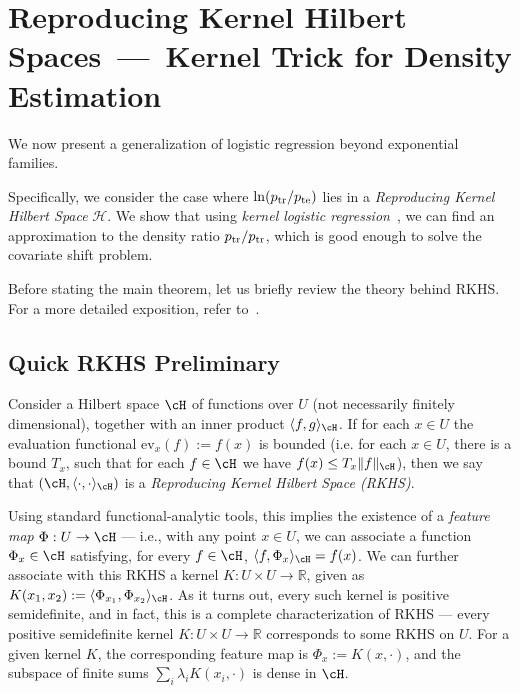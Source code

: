 \section{Reproducing Kernel Hilbert Spaces~---~Kernel Trick for Density Estimation}\label{sec:RKHS}
We now present a generalization of logistic regression beyond exponential families.

Specifically, we consider the case where $\ln (p_{\mathrm{tr}}/p_{\mathrm{te}})$ lies in a \emph{Reproducing Kernel Hilbert Space} $\mathcal{H}$. We show that using \emph{kernel logistic regression}~\cite{zhu2005kernel}, we can find an approximation to the density ratio $p_{\mathrm{tr}}/p_{\mathrm{tr}}$, which is good enough to solve the covariate shift problem. 

Before stating the main theorem, let us briefly review the theory behind RKHS. For a more detailed exposition, refer to~\cite{ghojogh2021reproducing}.

\subsection{Quick RKHS Preliminary \label{sec:rkhs-prelim}}

Consider a Hilbert space $\cH$ of functions over $U$ (not necessarily finitely dimensional), together with an inner product $\langle f,g \rangle_\cH$. If for each $x \in U$ the evaluation functional $\mathrm{ev}_x(f) := f(x)$ is bounded (i.e. for each $x \in U$, there is a bound $T_{x}$, such that for each $f \in \cH$ we have $f(x) \leq T_x \|f\|_{\cH}$), then we say that $(\cH, \langle \cdot, \cdot\rangle_{\cH})$ is a \emph{Reproducing Kernel Hilbert Space (RKHS)}. 

Using standard functional-analytic tools, this implies the existence of a \emph{feature map} $\Phi: U \to \cH$ --- i.e., with any point $x \in U$, we can associate a function $\Phi_x \in \cH$ satisfying, for every $f \in \cH$, $\langle f, \Phi_x \rangle_{\cH} = f(x)$. We can further associate with this RKHS a kernel $K : U\times U \to \mathbb{R}$, given as $K(x_1, x_2) := \langle \Phi_{x_1}, \Phi_{x_2}\rangle_{\cH}$. As it turns out, every such kernel is positive semidefinite, and in fact, this is a complete characterization of RKHS --- every positive semidefinite kernel $K: U \times U \to \mathbb{R}$ corresponds to some RKHS on $U$. For a given kernel $K$, the corresponding feature map is $\Phi_x := K(x, \cdot)$, and the subspace of finite sums
$\sum_i \lambda_i K(x_i, \cdot)$ is dense in $\cH$.


